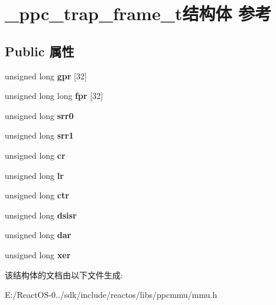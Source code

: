 \hypertarget{struct__ppc__trap__frame__t}{}\section{\+\_\+ppc\+\_\+trap\+\_\+frame\+\_\+t结构体 参考}
\label{struct__ppc__trap__frame__t}
\subsection*{Public 属性}
\begin{DoxyCompactItemize}
\item 
\mbox{\label{struct__ppc__trap__frame__t_a943d4a4cf9ccd69dfc05de38ad58e487}} 
unsigned long {\bfseries gpr} \mbox{[}32\mbox{]}
\item 
\mbox{\label{struct__ppc__trap__frame__t_a2f1897a65e77aaa3eb977510f372a302}} 
unsigned long long {\bfseries fpr} \mbox{[}32\mbox{]}
\item 
\mbox{\label{struct__ppc__trap__frame__t_a1531a87c4a1e7348a775ced6783c8070}} 
unsigned long {\bfseries srr0}
\item 
\mbox{\label{struct__ppc__trap__frame__t_a7d912344d74ca6a0ba5fbcaaff973c5f}} 
unsigned long {\bfseries srr1}
\item 
\mbox{\label{struct__ppc__trap__frame__t_acc2189f0b64ad4bf03ae38480d274aff}} 
unsigned long {\bfseries cr}
\item 
\mbox{\label{struct__ppc__trap__frame__t_a43657050f417fa0faf1d21c4c28b1b45}} 
unsigned long {\bfseries lr}
\item 
\mbox{\label{struct__ppc__trap__frame__t_a772d8fc8fe4007f6a17dcec7d72171e8}} 
unsigned long {\bfseries ctr}
\item 
\mbox{\label{struct__ppc__trap__frame__t_aad9a23ec17a4f2dfcbdce98de3b8d31d}} 
unsigned long {\bfseries dsisr}
\item 
\mbox{\label{struct__ppc__trap__frame__t_aadbca27f4837e4d4e3887450042e88f4}} 
unsigned long {\bfseries dar}
\item 
\mbox{\label{struct__ppc__trap__frame__t_aaaa3422ed8ef48b32f6586bfe28dd2da}} 
unsigned long {\bfseries xer}
\end{DoxyCompactItemize}


该结构体的文档由以下文件生成\+:\begin{DoxyCompactItemize}
\item 
E\+:/\+React\+O\+S-\/0../sdk/include/reactos/libs/ppcmmu/mmu.\+h\end{DoxyCompactItemize}
